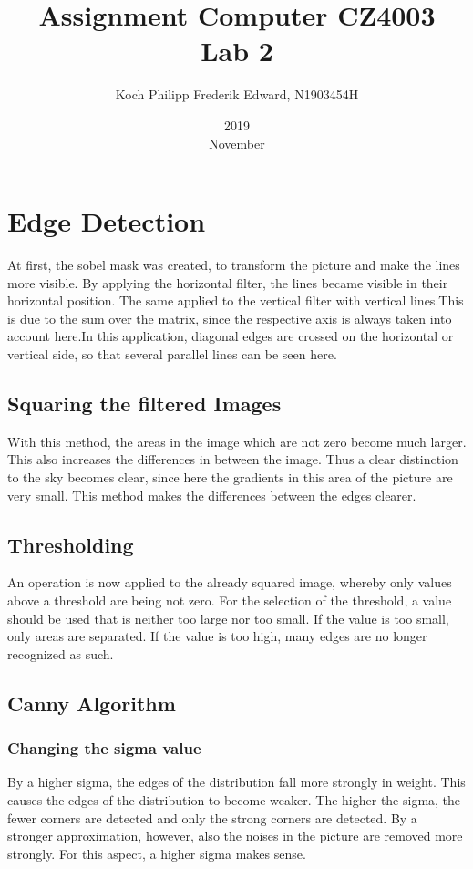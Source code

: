 \documentclass{article}
\title{Assignment Computer CZ4003 \\ Lab 2}
\date{2019 \\ November}
\author{Koch Philipp Frederik Edward, N1903454H}
\begin{document}
	
	\maketitle
	
	\section{Edge Detection}
	At first, the sobel mask was created, to transform the picture and make the lines more visible.
	By applying the horizontal filter, the lines became visible in their horizontal position.
	The same applied to the vertical filter with vertical lines.This is due to the sum over the matrix, 
	since the respective axis is always taken into account here.In this application, 
	diagonal edges are crossed on the horizontal or vertical side, so that several parallel lines can be seen here.
	\subsection{Squaring the filtered Images}
	With this method, the areas in the image which are not zero become much larger. This also increases the differences in between the image.
	Thus a clear distinction to the sky becomes clear, since here the gradients in this area of the picture are very small. 
	This method makes the differences between the edges clearer.
	\subsection{Thresholding}
	An operation is now applied to the already squared image, whereby only values above a threshold are being not zero. 
	For the selection of the threshold, a value should be used that is neither too large nor too small. 
	If the value is too small, only areas are separated. If the value is too high, many edges are no longer recognized as such.
	\subsection{Canny Algorithm}
	\subsubsection{Changing the sigma value}
	By a higher sigma, the edges of the distribution fall more strongly in weight. This causes the edges of the distribution to become weaker. 
	The higher the sigma, the fewer corners are detected and only the strong corners are detected. By a stronger approximation, 
	however, also the noises in the picture are removed more strongly. For this aspect, a higher sigma makes sense.
\end{document}
